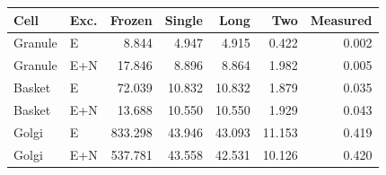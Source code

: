 \begin{tabular}{llrrrrr}
\toprule
Cell & Exc. & Frozen & Single & Long & Two & Measured\\
\midrule
Granule & E & 8.844 & 4.947 & 4.915 & 0.422 & 0.002 \\
Granule & E+N & 17.846 & 8.896 & 8.864 & 1.982 & 0.005 \\
Basket & E & 72.039 & 10.832 & 10.832 & 1.879 & 0.035 \\
Basket & E+N & 13.688 & 10.550 & 10.550 & 1.929 & 0.043 \\
Golgi & E & 833.298 & 43.946 & 43.093 & 11.153 & 0.419 \\
Golgi & E+N & 537.781 & 43.558 & 42.531 & 10.126 & 0.420 \\
\bottomrule
\end{tabular}
